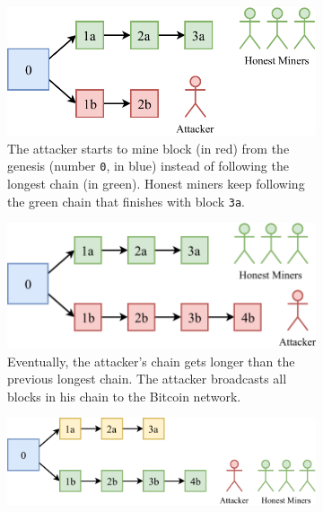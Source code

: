 \begin{figure}[t!]
	\begin{subfigure}{\textwidth}
		\centering
		\vspace*{0.25cm}
		\includegraphics[scale=0.9]{figures/majority_attack_1}
		\vspace*{0.25cm}
		\caption{
			The attacker starts to mine block (in red) from the genesis (number \texttt{0}, in blue) instead of following the longest chain (in green).
			Honest miners keep following the green chain that finishes with block \texttt{3a}.
		}
		\vspace*{0.75cm}
		\label{fig:majority-attack-1}
	\end{subfigure}
	\begin{subfigure}{\textwidth}
		\centering
		\vspace*{0.25cm}
		\includegraphics[scale=0.9]{figures/majority_attack_2}
		\vspace*{0.25cm}
		\caption{
			Eventually, the attacker's chain gets longer than the previous longest chain.
			The attacker broadcasts all blocks in his chain to the Bitcoin network.
		}
		\vspace*{0.75cm}
		\label{fig:majority-attack-2}
	\end{subfigure}
	\begin{subfigure}{\textwidth}
		\centering
		\vspace*{0.25cm}
		\includegraphics[scale=0.9]{figures/majority_attack_3}

\end{subfigure}
\end{figure}
